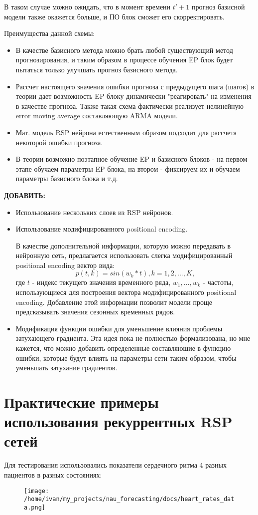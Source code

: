 \documentclass[11pt]{article}
\begin{document}
В таком случае можно ожидать, что в момент времени $ t' + 1 $ прогноз базисной модели также окажется больше, и ПО блок сможет его скорректировать. 

Преимущества данной схемы:
\begin{itemize}
\item В качестве базисного метода можно брать любой существующий метод прогнозирования, и таким образом в процессе обучения EP блок будет пытаться только улучшать прогноз базисного метода.
\item Рассчет настоящего значения ошибки прогноза с предыдущего шага (шагов) в теории дает возможность EP блоку динамически "реагировать" на изменения в качестве прогноза. Также такая схема фактически реализует нелинейную error moving average составляющую ARMA модели.
\item Мат. модель RSP нейрона естественным образом подходит для рассчета некоторой ошибки прогноза.
\item В теории возможно поэтапное обучение EP и базисного блоков - на первом этапе обучаем параметры EP блока, на втором - фиксируем их и обучаем параметры базисного блока и т.д.
\end{itemize}

\textbf{ДОБАВИТЬ:}

\begin{itemize}
  \item Использование нескольких слоев из RSP нейронов. 
  \item Использование модифицированного positional encoding.

В качестве дополнительной информации, которую можно передавать в нейронную сеть, предлагается использовать слегка модифицированный positional encoding вектор вида:
$$ p(t, k) = sin(w_k * t), k=1,2,...,K, $$
где $t$ - индекс текущего значения временного ряда, $w_1, ..., w_k$ - частоты, использующиеся для построения вектора модифицированного positional encoding. Добавление этой информации позволит модели проще предсказывать значения сезонных временных рядов.
  \item Модификация функции ошибки для уменьшение влияния проблемы затухающего градиента. Эта идея пока не полностью формализована, но мне кажется, что можно добавить определенные составляющие в функцию ошибки, которые будут влиять на параметры сети таким образом, чтобы уменьшать затухание градиентов. 


\end{itemize}

\section*{Практические примеры использования рекуррентных RSP сетей}
Для тестирования использовались показатели сердечного ритма 4 разных пациентов в разных состояниях:
\begin{figure}[H]
\centering
\texttt{[image: /home/ivan/my\_projects/nau\_forecasting/docs/heart\_rates\_data.png]}
\label{}
\end{figure}
\end{document}
